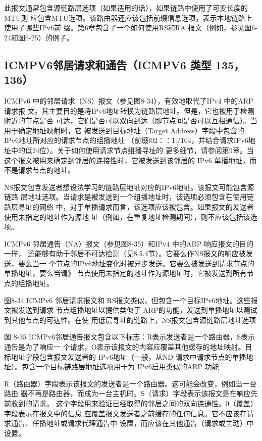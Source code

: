 此报文通常包含源链路层选项（如果适用的话），如果链路中使用了可变长度的MTU则
应包含MTU选项。该路由器还应该包括前缀信息选项，表示本地链路上使用了哪些IPv6前
缀。第6章包含了一个如何使用RS和RA 报文（例如，参见图6-24和图6-25）的例子。

\subsection{ICMPV6邻居请求和通告（ICMPV6 类型 135，136）}
ICMPv6 中的邻居请求（NS）报文（参见图8-34），有效地取代了IPv4 中的ARP请求报
文。其主要目的是将IPv6地址转换为链路层地址。但是，它也被用于检测附近的节点是否
可达，它们是否可以双向到达（即节点间是否可以互相通信）。当用于确定地址映射时，它
被发送到目标地址（Target Address）字段中包含的IPv6地址所对应的请求节点的组播地址
（前缀f02：：1:/104，并结合请求IPv6地址中的低24位）。关于如何使用请求节点组播寻址的
更多细节，请参阅第9章。当这个报文被用来确定到邻居的连接性时，它被发送到该邻居的
IPv6 单播地址，而不是请求节点的地址。

NS报文包含发送者想设法学习的链路层地址对应的IPv6地址。该报文可能包含源链路
层地址选项。当请求是被发送到一个组播地址时，该选项必须包含在使用链路层寻址的网络
中，对于单播请求而言，该选项应该被包含。如果报文的发送者使用未指定的地址作为源地
址（例如，在重复地址检测期间），则不应该包括该选项。

ICMPv6 邻居通告（NA）报文（参见图8-35）和IPv4 中的ARP 响应报文的目的一样，
还能够有助于邻居不可达检测（见8.5.4节）。它要么作NS报文的响应被发送，要么当一
个节点的IPv6地址变化时被异步发送。它要么被发送到请求节点的单播地址，要么当请》
节点使用未指定的地址作为源地址时，它被发送到所有节点的组播地址。

图8-34 ICMPv6 邻居请求报文和 RS报文类似，但包含一个目标IPv6地址。这些报文被发送到请求
节点组播地址以提供类似于 ARP的功能，发送到单播地址以测试到其他节点的可达性。在使
用低层寻址的链路上，NS报文包含源链路层地址选项


图 8-35
ICMPv6邻居通告报文包含以下标志：R表示发送者是一个路由器，S表示通告是为了响应一
个请求，O表示该报文的内容应覆盖其他缓存的地址映射。目标地址字段包含报文发送者的
IPv6地址（一般，从ND 请求中请求节点的单播地址）。包含一个目标链路层地址选项用于为
IPv6启用类似的ARP 功能

R（路由器）字段表示该报文的发送者是一个路由器。这可能会改变，例如当一台路由
器不再是路由器，而成为一台主机时。S（请求）字段表示该报文是在响应先前收到的请求。
这个字段用来验证已经取得的邻居之间的双向连通性。0（覆盖）字段表示在报文中的信息
应覆盖报文发送者之前缓存的任何信息。它不应该在请求通告、任播地址或请求代理通告中
设置，而应该在其他通告（请求或主动）中设置。


